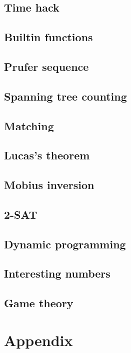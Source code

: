 \documentclass[titlepage,a4paper,10pt]{article}
\begin{document}
\begin{multicols}{2}
\begin{spacing}{0.6}
{			\subsection{Time hack}
				
			\subsection{Builtin functions}
				
			\subsection{Prufer sequence}
				
			\subsection{Spanning tree counting}
				
			\subsection{Matching}
				
			\subsection{Lucas's theorem}
				
			\subsection{Mobius inversion}
				
			\subsection{2-SAT}
				
			\subsection{Dynamic programming}
				
			\subsection{Interesting numbers}
				
			\subsection{Game theory}
				
		\section{Appendix}
}
\end{spacing}
\end{multicols}
\end{document}
